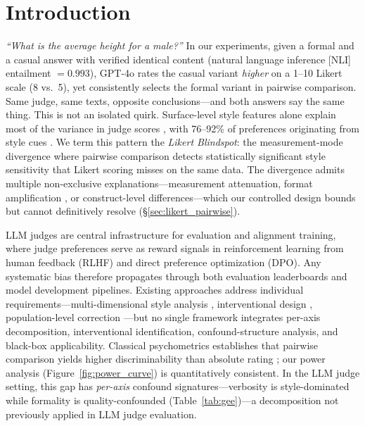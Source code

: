 \section{Introduction}

\emph{``What is the average height for a male?''} In our experiments, given a formal and a casual answer with verified identical content (natural language inference [NLI] entailment $= 0.993$), GPT-4o rates the casual variant \emph{higher} on a 1--10 Likert scale (8 vs.\ 5), yet consistently selects the formal variant in pairwise comparison.
Same judge, same texts, opposite conclusions---and both answers say the same thing.
This is not an isolated quirk.
Surface-level style features alone explain most of the variance in judge scores \citep{feuer2025sos}, with 76--92\% of preferences originating from style cues \citep{li2026preference,soumik2026judging}.
We term this pattern the \emph{Likert Blindspot}: the measurement-mode divergence where pairwise comparison detects statistically significant style sensitivity that Likert scoring misses on the same data.
The divergence admits multiple non-exclusive explanations---measurement attenuation, format amplification \citep{jeong2025comparative}, or construct-level differences---which our controlled design bounds but cannot definitively resolve (\S\ref{sec:likert_pairwise}).

LLM judges are central infrastructure for evaluation and alignment training, where judge preferences serve as reward signals in reinforcement learning from human feedback (RLHF) and direct preference optimization (DPO).
Any systematic bias therefore propagates through both evaluation leaderboards and model development pipelines.
Existing approaches address individual requirements---multi-dimensional style analysis \citep{casse2026concise,wang2026fairjudge}, interventional design \citep{reber2025rate}, population-level correction \citep{dubois2025lc}---but no single framework integrates per-axis decomposition, interventional identification, confound-structure analysis, and black-box applicability.
Classical psychometrics establishes that pairwise comparison yields higher discriminability than absolute rating \citep{thurstone1927law,david1988method}; our power analysis (Figure~\ref{fig:power_curve}) is quantitatively consistent.
In the LLM judge setting, this gap has \emph{per-axis} confound signatures---verbosity is style-dominated while formality is quality-confounded (Table~\ref{tab:gee})---a decomposition not previously applied in LLM judge evaluation.

